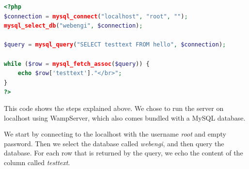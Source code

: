 \begin{lstlisting}[language=php,label=lst:aspectratio] 
<?php
$connection = mysql_connect("localhost", "root", "");
mysql_select_db("webengi", $connection);

$query = mysql_query("SELECT testtext FROM hello", $connection);

while ($row = mysql_fetch_assoc($query)) {
    echo $row['testtext']."</br>";
}
?>
\end{lstlisting}

This code shows the steps explained above. We chose to run the server on localhost using WampServer, which also comes bundled with a MySQL database.

We start by connecting to the localhost with the username \textit{root} and empty password. Then we select the database called \textit{webengi}, and then query the database. For each row that is returned by the query, we echo the content of the column called \textit{testtext}.